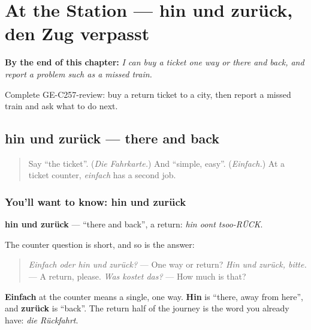 
\chapter{At the Station — hin und zurück, den Zug verpasst}
\label{ch:ge-at-the-station}

\begin{chapteropening}
\textbf{By the end of this chapter:} \emph{I can buy a ticket one way or there and back, and report a problem such as a missed train.}

Complete GE-C257-review: buy a return ticket to a city, then report a missed train and ask what to do next.
\end{chapteropening}

\section[hin und zurück]{hin und zurück — there and back}

\label{lesson:GE-C257-hin-und-zurueck}



\begin{quote}
Say \textquotedblleft{}the ticket\textquotedblright{}. (\emph{Die Fahrkarte.}) And \textquotedblleft{}simple, easy\textquotedblright{}. (\emph{Einfach.}) At a ticket counter, \emph{einfach} has a second job.
\end{quote}

\subsection*{You'll want to know: hin und zurück}
\textbf{hin und zurück} — \textquotedblleft{}there and back\textquotedblright{}, a return: \emph{hin oont tsoo-RÜCK}.

The counter question is short, and so is the answer:

\begin{quote}
\emph{Einfach oder hin und zurück?} — One way or return? \emph{Hin und zurück, bitte.} — A return, please. \emph{Was kostet das?} — How much is that?
\end{quote}

\textbf{Einfach} at the counter means a single, one way. \textbf{Hin} is \textquotedblleft{}there, away from here\textquotedblright{}, and \textbf{zurück} is \textquotedblleft{}back\textquotedblright{}. The return half of the journey is the word you already have: \emph{die Rückfahrt}.

